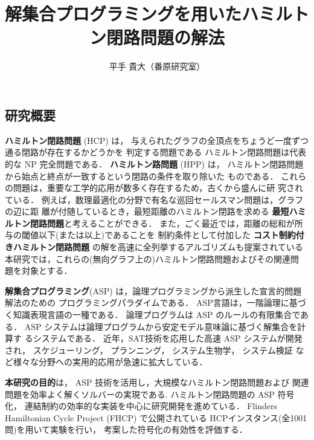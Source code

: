 \documentclass[a4j,10pt]{jarticle}
\title{解集合プログラミングを用いたハミルトン閉路問題の解法}
\author{平手 貴大（番原研究室）}
\date{}
\begin{document}
\maketitle
\thispagestyle{empty}
\begin{multicols}{1}

\section{研究概要}
\textbf{ハミルトン閉路問題} (HCP) は，
与えられたグラフの全頂点をちょうど一度ずつ通る閉路が存在するかどうかを
判定する問題である
ハミルトン閉路問題は代表的な NP 完全問題である．
\textbf{ハミルトン路問題} (HPP) は，
ハミルトン閉路問題から始点と終点が一致するという閉路の条件を取り除いた
ものである．
これらの問題は，重要な工学的応用が数多く存在するため，古くから盛んに研
究されている．
例えば，数理最適化の分野で有名な巡回セールスマン問題は，グラフの辺に距
離が付随しているとき，最短距離のハミルトン閉路を求める
\textbf{最短ハミルトン閉路問題}と考えることができる．
また，ごく最近では，距離の総和が所与の閾値以下(または以上)であることを
制約条件として付加した
\textbf{コスト制約付きハミルトン閉路問題}
の解を高速に全列挙するアルゴリズムも提案されている
本研究では，これらの(無向グラフ上の)ハミルトン閉路問題およびその関連問
題を対象とする．

\textbf{解集合プログラミング}(ASP)
は，論理プログラミングから派生した宣言的問題解法のための
プログラミングパラダイムである．
ASP言語は，一階論理に基づく知識表現言語の一種である．
論理プログラムは ASP のルールの有限集合である．
ASP システムは論理プログラムから安定モデル意味論に基づく解集合を計算す
るシステムである．
近年，SAT技術を応用した高速 ASP システムが開発され，
スケジューリング，
プランニング，
システム生物学，
システム検証
など様々な分野への実用的応用が急速に拡大している．

\textbf{本研究の目的}は，
ASP 技術を活用し，大規模なハミルトン閉路問題および
関連問題を効率よく解くソルバーの実現である.
ハミルトン閉路問題の ASP 符号化，
連結制約の効率的な実装を中心に研究開発を進めている．
Flinders Hamiltonian Cycle Project (FHCP) で公開されている
HCPインスタンス(全1001問)を用いて実験を行い，
考案した符号化の有効性を評価する．


\end{multicols}
\end{document}
